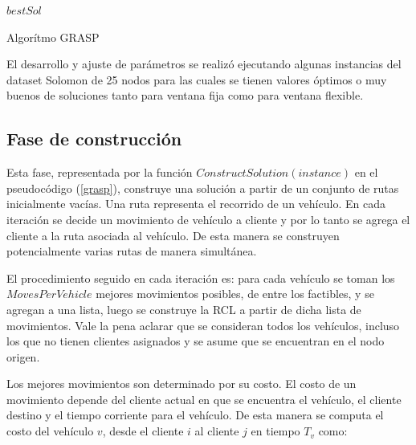 \documentclass{article}
\begin{document}
  \begin{algorithm}
    \begin{algorithmic}
          \EndIf
            \EndIf
          \EndFor
          \EndIf
        \EndFor
        \State \Return $bestSol$
      \EndFunction
    \end{algorithmic}
    \caption{Algorítmo GRASP \label{grasp}}
  \end{algorithm}

  El desarrollo y ajuste de parámetros se realizó ejecutando algunas instancias del dataset Solomon de 25 nodos para las cuales se tienen valores óptimos o muy buenos de soluciones tanto para ventana fija como para ventana flexible.

  \subsection*{Fase de construcción}

  Esta fase, representada por la función $ConstructSolution(instance)$ en el pseudocódigo (\ref{grasp}), construye una solución a partir de un conjunto de rutas inicialmente vacías. Una ruta representa el recorrido de un vehículo. En cada iteración se decide un movimiento de vehículo a cliente y por lo tanto se agrega el cliente a la ruta asociada al vehículo. De esta manera se construyen potencialmente varias rutas de manera simultánea.

  El procedimiento seguido en cada iteración es: para cada vehículo se toman los $MovesPerVehicle$ mejores movimientos posibles, de entre los factibles, y se agregan a una lista, luego se construye la RCL a partir de dicha lista de movimientos. Vale la pena aclarar que se consideran todos los vehículos, incluso los que no tienen clientes asignados y se asume que se encuentran en el nodo origen.

  Los mejores movimientos son determinado por su costo. El costo de un movimiento depende del cliente actual en que se encuentra el vehículo, el cliente destino y el tiempo corriente para el vehículo. De esta manera se computa el costo del vehículo $v$, desde el cliente $i$ al cliente $j$ en tiempo $T_v$ como:
\end{document}
